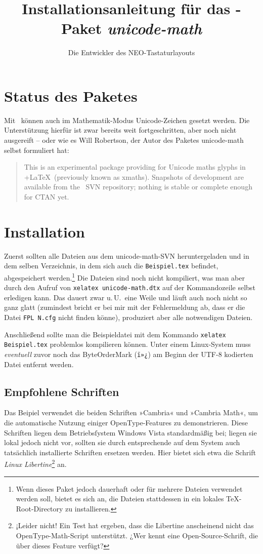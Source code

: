 ﻿\documentclass{scrartcl}
\begin{document}
\title{Installationsanleitung für das \XeTeX-Paket \emph{unicode-math}}
\author{Die Entwickler des NEO-Tastaturlayouts}
\maketitle
\tableofcontents

\section{Status des Paketes}
Mit \XeTeX\ können auch im Mathematik-Modus Unicode-Zeichen gesetzt werden. Die Unterstützung hierfür ist zwar bereits weit fortgeschritten, aber noch nicht ausgereift – oder wie es Will Robertson, der Autor des Paketes unicode-math selbst formuliert hat:
\begin{quote}
This is an experimental package providing for Unicode maths glyphs in \XeTeX+\LaTeX\ (previously known as xmaths). Snapshots of development are available from the \XeTeX\ SVN repository; nothing is stable or complete enough for CTAN yet.
\end{quote}

\section{Installation}
Zuerst sollten alle Dateien aus dem unicode-math-SVN heruntergeladen und in dem selben Verzeichnis, in dem sich auch die \verb|Beispiel.tex| befindet, abgespeichert werden.\footnote{Wenn dieses Paket jedoch dauerhaft oder für mehrere Dateien verwendet werden soll, bietet es sich an, die Dateien stattdessen in ein lokales \TeX-Root-Directory zu installieren.} Die Dateien sind noch nicht kompiliert, was man aber durch den Aufruf von \verb|xelatex unicode-math.dtx| auf der Kommandozeile selbst erledigen kann. Das dauert zwar u.\,U.\ eine Weile und läuft auch noch nicht so ganz glatt (zumindest bricht er bei mir mit der Fehlermeldung ab, dass er die Datei \verb|FPL N.cfg| nicht finden könne), produziert aber alle notwendigen Dateien.

Anschließend sollte man die Beispieldatei mit dem Kommando \verb|xelatex Beispiel.tex| problemlos kompilieren können. Unter einem Linux-System muss \emph{eventuell} zuvor noch das ByteOrderMark (\verb|ï»¿|) am Beginn der UTF-8 kodierten Datei entfernt werden.


\subsection{Empfohlene Schriften}
Das Beipiel verwendet die beiden Schriften »Cambria« und »Cambria Math«, um die automatische Nutzung einiger OpenType-Features zu demonstrieren. Diese Schriften liegen dem Betriebsſystem Windows Vista standardmäßig bei; liegen sie lokal jedoch nicht vor, sollten sie durch entsprechende auf dem System auch tatsächlich installierte Schriften ersetzen werden. Hier bietet sich etwa die  Schrift \emph{Linux Libertine}\footnote{¡Leider nicht! Ein Test hat ergeben, dass die Libertine anscheinend nicht das OpenType-Math-Script unterstützt. ¿Wer kennt eine Open-Source-Schrift, die über dieses Feature verfügt?} an.
\end{document}
